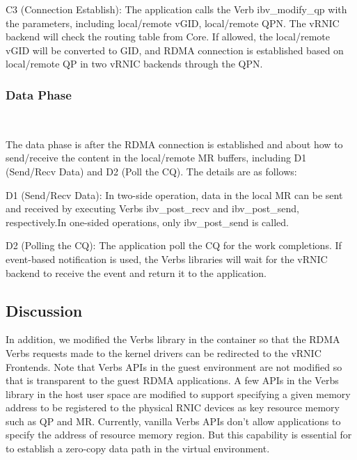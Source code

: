 C3 (Connection Establish): The application calls the Verb ibv\_modify\_qp with the parameters, including local/remote vGID, local/remote QPN. The vRNIC backend will check the routing table from \sys Core. If allowed, the local/remote vGID will be converted to GID, and RDMA connection is established based on local/remote QP in two vRNIC backends through the QPN. 

\subsubsection{\textbf{Data Phase}}
\
\noindent

The data phase is after the RDMA connection is established and about how to send/receive the content in the local/remote MR buffers, including D1 (Send/Recv Data) and D2 (Poll the CQ). The details are as follows:


D1 (Send/Recv Data): In two-side operation, data in the local MR can be sent and received by executing Verbs ibv\_post\_recv and ibv\_post\_send, respectively.In one-sided operations, only ibv\_post\_send is called.


D2 (Polling the CQ): The application poll the CQ for the work completions. If event-based notification is used, the Verbs libraries will wait for the vRNIC backend to receive the event and return it to the application.

\subsection{Discussion}

In addition, we modified the Verbs library in the container so that the RDMA Verbs requests made to the kernel drivers can be redirected to the vRNIC Frontends. Note that Verbs APIs in the guest environment are not modified so that \sys is transparent to the guest RDMA applications. A few APIs in the Verbs library in the host user space are modified to support specifying a given memory address to be registered to the physical RNIC devices as key resource memory such as QP and MR. Currently, vanilla Verbs APIs don't allow applications to specify the address of resource memory region. But this capability is essential for \sys to establish a zero-copy data path in the virtual environment.


